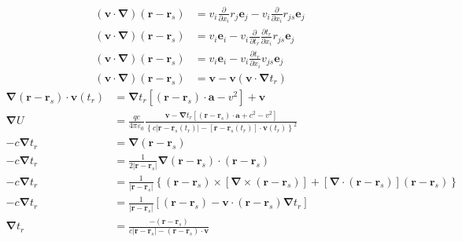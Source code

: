 \begin{align*}
    (\boldsymbol{v}\cdot\boldsymbol{\nabla})(\boldsymbol{r}-\boldsymbol{r}_s)&=v_i\frac{\partial }{\partial x_i}r_j\boldsymbol{e}_j-v_i\frac{\partial }{\partial x_i}r_{js}\boldsymbol{e}_{j}\\
    (\boldsymbol{v}\cdot\boldsymbol{\nabla})(\boldsymbol{r}-\boldsymbol{r}_s)&=v_i\boldsymbol{e}_i-v_i\frac{\partial }{\partial t_r}\frac{\partial t_r}{\partial x_i}r_{js}\boldsymbol{e}_{j}\\
    (\boldsymbol{v}\cdot\boldsymbol{\nabla})(\boldsymbol{r}-\boldsymbol{r}_s)&=v_i\boldsymbol{e}_i-v_i\frac{\partial t_r}{\partial x_i}v_{js}\boldsymbol{e}_{j}\\
    (\boldsymbol{v}\cdot\boldsymbol{\nabla})(\boldsymbol{r}-\boldsymbol{r}_s)&=\boldsymbol{v}-\boldsymbol{v}(\boldsymbol{v}\cdot\boldsymbol{\nabla}t_r)
\end{align*}
\begin{align}
    \boldsymbol{\nabla}(\boldsymbol{r}-\boldsymbol{r}_s)\cdot\boldsymbol{v}(t_r)
    &=\boldsymbol{\nabla}t_r[(\boldsymbol{r}-\boldsymbol{r}_s) \cdot \boldsymbol{a}- v^2]
    +\boldsymbol{v}\\
    \boldsymbol{\nabla}U&=\frac{qc}{4\pi\varepsilon_0} \frac{\boldsymbol{v}-\boldsymbol{\nabla}t_r[(\boldsymbol{r}-\boldsymbol{r}_s) \cdot \boldsymbol{a}+c^2- v^2]}{\left\{c|\boldsymbol{r} - \boldsymbol{r}_s(t_r)|-[\boldsymbol{r}-\boldsymbol{r}_s(t_r)]\cdot\boldsymbol{v}(t_r)\right\}^2}\\
    -c\boldsymbol{\nabla}t_r&=\boldsymbol{\nabla}(\boldsymbol{r}-\boldsymbol{r}_s)\nonumber\\
    -c\boldsymbol{\nabla}t_r&=\frac{1}{2|\boldsymbol{r}-\boldsymbol{r}_s|}\boldsymbol{\nabla}(\boldsymbol{r}-\boldsymbol{r}_s)\cdot(\boldsymbol{r}-\boldsymbol{r}_s)\nonumber\\
    -c\boldsymbol{\nabla}t_r&=\frac{1}{|\boldsymbol{r}-\boldsymbol{r}_s|}\left\{(\boldsymbol{r}-\boldsymbol{r}_s)\times\left[\boldsymbol{\nabla}\times(\boldsymbol{r}-\boldsymbol{r}_s)\right]
    +\left[\boldsymbol{\nabla}\cdot(\boldsymbol{r}-\boldsymbol{r}_s)\right](\boldsymbol{r}-\boldsymbol{r}_s)\right\}\nonumber\\
    -c\boldsymbol{\nabla}t_r&=\frac{1}{|\boldsymbol{r}-\boldsymbol{r}_s|}\left[(\boldsymbol{r}-\boldsymbol{r}_s)-\boldsymbol{v}\cdot\left(\boldsymbol{r}-\boldsymbol{r}_s\right)\boldsymbol{\nabla}t_r\right]
    \\
    \boldsymbol{\nabla}t_r&=\frac{-(\boldsymbol{r}-\boldsymbol{r}_s)}{c|\boldsymbol{r}-\boldsymbol{r}_s|-(\boldsymbol{r}-\boldsymbol{r}_s)\cdot\boldsymbol{v}}
\end{align}
